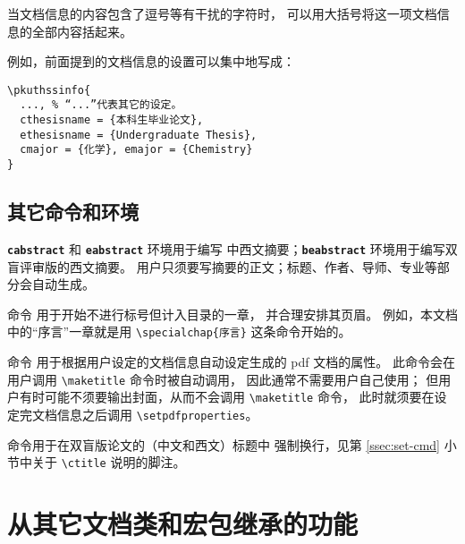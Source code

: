 当文档信息的内容包含了逗号等有干扰的字符时，
可以用大括号将这一项文档信息的全部内容括起来。

例如，前面提到的文档信息的设置可以集中地写成：
\begin{Verbatim}
\pkuthssinfo{
  ..., % “...”代表其它的设定。
  cthesisname = {本科生毕业论文},
  ethesisname = {Undergraduate Thesis},
  cmajor = {化学}, emajor = {Chemistry}
}
\end{Verbatim}

\subsection{其它命令和环境}\label{ssec:misc}

\texttt{\bfseries cabstract} 和 \texttt{\bfseries eabstract} 环境用于编写
中西文摘要；\texttt{\bfseries beabstract} 环境用于编写双盲评审版的西文摘要。
用户只须要写摘要的正文；标题、作者、导师、专业等部分会自动生成。

\texttt{\bfseries\string\specialchap} 命令
用于开始不进行标号但计入目录的一章，
并合理安排其页眉。%
例如，本文档中的“序言”一章就是用 \verb|\specialchap{序言}|
这条命令开始的。%

\texttt{\bfseries\string\setpdfproperties} 命令
用于根据用户设定的文档信息自动设定生成的 pdf 文档的属性。
此命令会在用户调用 \verb|\maketitle| 命令时被自动调用，
因此通常不需要用户自己使用；
但用户有时可能不须要输出封面，从而不会调用 \verb|\maketitle| 命令，
此时就须要在设定完文档信息之后调用 \verb|\setpdfproperties|。%

\texttt{\bfseries\string\thssnl} 命令用于在双盲版论文的（中文和西文）标题中
强制换行，见第 \ref{ssec:set-cmd} 小节中关于 \verb|\ctitle| 说明的脚注。

\section{从其它文档类和宏包继承的功能}\label{sec:thirdparty}

